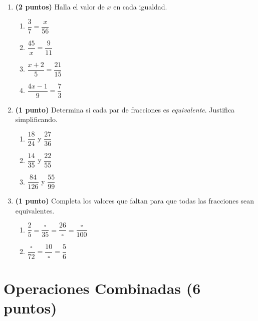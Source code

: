 \documentclass[12pt, letterpaper]{article}
\begin{document}
\begin{enumerate}[leftmargin=*]

  \item \textbf{(2 puntos)} Halla el valor de $x$ en cada igualdad.
        \begin{enumerate}[label=\alph*), leftmargin=*]
          \item $\dfrac{3}{7} = \dfrac{x}{56}$
          \item $\dfrac{45}{x} = \dfrac{9}{11}$
          \item $\dfrac{x + 2}{5} = \dfrac{21}{15}$
          \item $\dfrac{4x - 1}{9} = \dfrac{7}{3}$
        \end{enumerate}

  \item \textbf{(1 punto)} Determina si cada par de fracciones es \emph{equivalente}. Justifica simplificando.
        \begin{enumerate}[label=\alph*), leftmargin=*]
          \item $\dfrac{18}{24}$ y $\dfrac{27}{36}$
          \item $\dfrac{14}{35}$ y $\dfrac{22}{55}$
          \item $\dfrac{84}{126}$ y $\dfrac{55}{99}$
        \end{enumerate}

  \item \textbf{(1 punto)} Completa los valores que faltan para que todas las fracciones sean equivalentes.
        \begin{enumerate}[label=\alph*), leftmargin=*]
          \item $\dfrac{2}{5} = \dfrac{\square}{35} = \dfrac{26}{\square} = \dfrac{\square}{100}$
          \item $\dfrac{\square}{72} = \dfrac{10}{\square} = \dfrac{5}{6}$
        \end{enumerate}

\end{enumerate}

\section{Operaciones Combinadas (6 puntos)}
\end{document}
